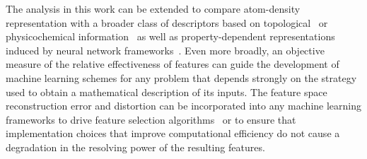 The analysis in this work can be extended to compare atom-density representation with a broader class of descriptors based on topological~\cite{isayev2017universal, sutton2019crowd, liu2019n} or physicochemical information~\cite{pilania2013accelerating, ward2016general, ouya+18prm} as well as property-dependent representations induced by neural network frameworks~\cite{schu+18jcp, cohen2018spherical}. 
Even more broadly, an objective measure of the relative effectiveness of features can guide the development of machine learning schemes for any problem that depends strongly on the strategy used to obtain a mathematical description of its inputs. 
The feature space reconstruction error and distortion can be incorporated into any machine learning frameworks to drive feature selection algorithms~\cite{imba+18jcp,ouya+18prm,paleico2021bin} or to ensure that implementation choices that improve computational efficiency do not cause a degradation in the resolving power of the resulting features.


